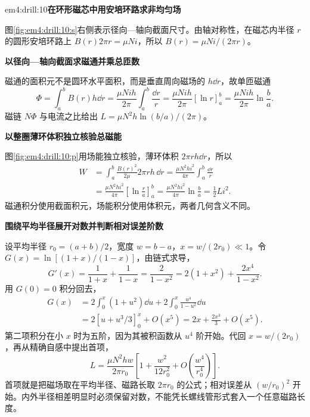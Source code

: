 \begin{drillsolution}{em4:drill:10}\textbf{在环形磁芯中用安培环路求非均匀场}\par\nobreak
图\ref{fig:em4:drill:10:s}右侧表示径向—轴向截面尺寸。由轴对称性，在磁芯内半径 $r$ 的圆形安培环路上 $B(r)2\pi r=\mu Ni$，所以 $B(r)=\mu Ni/(2\pi r)$。

\par\medskip{}\noindent\textbf{以径向—轴向截面求磁通并乘总匝数}\par\nobreak
磁通的面积元不是圆环水平面积，而是垂直周向磁场的 $h\dd r$，故单匝磁通
\[\Phi=\int_a^bB(r)h\dd r
=\frac{\mu Nih}{2\pi}\int_a^b\frac{\dd r}{r}
=\frac{\mu Nih}{2\pi}[\ln r]_a^b
=\frac{\mu Nih}{2\pi}\ln\frac ba.\]
磁链 $N\Phi$ 与电流之比给出 $L=\mu N^2h\ln(b/a)/(2\pi)$。



\par\medskip{}\noindent\textbf{以整圈薄环体积独立核验总磁能}\par\nobreak
图\ref{fig:em4:drill:10:p}用场能独立核验，薄环体积 $2\pi rh\dd r$，所以\begin{align*}
W&=\int_a^b\frac{B(r)^2}{2\mu}2\pi rh\,\dd r
=\frac{\mu N^2hi^2}{4\pi}\int_a^b\frac{\dd r}{r}\\
&=\frac{\mu N^2hi^2}{4\pi}\left[\ln\frac ra\right]_a^b
=\frac{\mu N^2hi^2}{4\pi}\ln\frac ba=\frac12Li^2.
\end{align*}磁通积分使用截面积元，场能积分使用体积元，两者几何含义不同。



\par\medskip{}\noindent\textbf{围绕平均半径展开对数并判断相对误差阶数}\par\nobreak
设平均半径 $r_0=(a+b)/2$，宽度 $w=b-a$，$x=w/(2r_0)\ll1$。令 $G(x)=\ln[(1+x)/(1-x)]$，由链式求导，
\[
 G'(x)=\frac1{1+x}+\frac1{1-x}
 =\frac2{1-x^2}=2(1+x^2)+\frac{2x^4}{1-x^2}.
\]
用 $G(0)=0$ 积分回去，
\[
 \begin{aligned}
 G(x)&=2\int_0^x(1+u^2)\dd u
       +2\int_0^x\frac{u^4}{1-u^2}\dd u\\
 &=2[u+u^3/3]_0^x+O(x^5)=2x+\frac{2x^3}{3}+O(x^5).
 \end{aligned}
\]
第二项积分在小 $x$ 时为五阶，因为其被积函数从 $u^4$ 阶开始。代回 $x=w/(2r_0)$，再从精确自感中提出首项，
\[
 L=\frac{\mu N^2hw}{2\pi r_0}
 \left[1+\frac{w^2}{12r_0^2}+O\!\left(\frac{w^4}{r_0^4}\right)\right].
\]
首项就是把磁场取在平均半径、磁路长取 $2\pi r_0$ 的公式；相对误差从 $(w/r_0)^2$ 开始。内外半径相差明显时必须保留对数，不能凭长螺线管形式套入一个任意磁路长度。\end{drillsolution}
